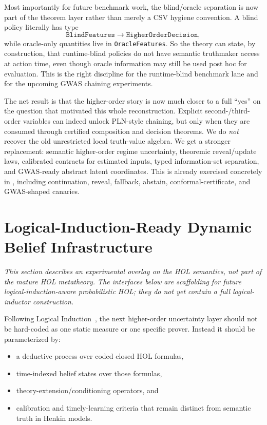 \documentclass[11pt,openany]{report}
\begin{document}
Most importantly for future benchmark work, the blind/oracle separation is now
part of the theorem layer rather than merely a CSV hygiene convention.  A blind
policy literally has type
\[
  \texttt{BlindFeatures} \to \texttt{HigherOrderDecision},
\]
while oracle-only quantities live in \texttt{OracleFeatures}.  So the theory
can state, by construction, that runtime-blind policies do not have semantic
truthmaker access at action time, even though oracle information may still be
used post hoc for evaluation.  This is the right discipline for the
runtime-blind benchmark lane and for the upcoming GWAS chaining experiments.

The net result is that the higher-order story is now much closer to a full
``yes'' on the question that motivated this whole reconstruction.  Explicit
second-/third-order variables can indeed unlock PLN-style chaining, but only
when they are consumed through certified composition and decision theorems.  We
do \emph{not} recover the old unrestricted local truth-value algebra.  We get a
stronger replacement: semantic higher-order regime uncertainty, theoremic
reveal/update laws, calibrated contracts for estimated inputs, typed
information-set separation, and GWAS-ready abstract latent coordinates.  This
is already exercised concretely in
,
including continuation, reveal, fallback, abstain, conformal-certificate, and
GWAS-shaped canaries.

\section{Logical-Induction-Ready Dynamic Belief Infrastructure}

\emph{This section describes an experimental overlay on the HOL semantics, not
part of the mature HOL metatheory.  The interfaces below are scaffolding for
future logical-induction-aware probabilistic HOL; they do not yet contain a
full logical-inductor construction.}

\medskip

Following Logical Induction~\cite{Garrabrant2020LogicalInduction}, the next
higher-order uncertainty layer should not be hard-coded as one static measure
or one specific prover.  Instead it should be parameterized by:
\begin{itemize}
\item a deductive process over coded closed HOL formulas,
\item time-indexed belief states over those formulas,
\item theory-extension/conditioning operators, and
\item calibration and timely-learning criteria that remain distinct from
  semantic truth in Henkin models.
\end{itemize}
\end{document}
